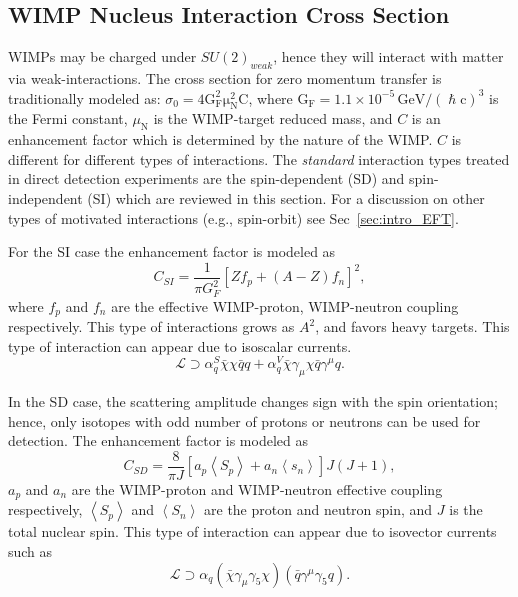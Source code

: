 \subsection{WIMP Nucleus Interaction Cross Section}
\label{subsubsec:WIMP_CS}

WIMPs may be charged under $SU(2)_{weak}$, hence they will interact with matter via weak-interactions. The cross section for zero momentum transfer is traditionally modeled as: $\sigma_0 = \mathrm{4G^2_F\mu_N^2C}$, where $\mathrm{G_F = 1.1\times 10^{-5}\,GeV/(\hslash c)^3}$ is the Fermi constant, $\mu_\mathrm{N}$ is the WIMP-target reduced mass, and $C$ is an enhancement factor which is determined by the nature of the WIMP. $C$ is different for different types of interactions. The \textit{standard} interaction types treated in direct detection experiments are the spin-dependent (SD) and spin-independent (SI) which are reviewed in this section. For a discussion on other types of motivated interactions (e.g., spin-orbit) see Sec~\ref{sec:intro_EFT}.

For the SI case the enhancement factor is modeled as
\begin{equation}
C_{SI} = \frac{1}{\pi G_F^2}[Zf_p + (A-Z)f_n]^2,
\end{equation} 
where $f_p$ and $f_n$ are the effective WIMP-proton, WIMP-neutron coupling respectively. This type of interactions grows as $A^2$, and favors heavy targets. This type of interaction can appear due to isoscalar currents.
\begin{equation}
\mathcal{L} \supset \alpha_q^S \bar{\chi} \chi \bar{q}q + \alpha_q^V\bar{\chi}\gamma_\mu\chi\bar{q}\gamma^\mu q.  
\end{equation}

In the SD case, the scattering amplitude changes sign with the spin orientation; hence, only isotopes with odd number of protons  or neutrons can be used for detection. The enhancement factor is modeled as
\begin{equation}
C_{SD} = \frac{8}{\pi J}[a_p\left<S_p\right> + a_n\left<s_n\right>]J(J+1),
\end{equation}  
$a_p$ and $a_n$ are the WIMP-proton and WIMP-neutron effective coupling respectively, $\left<S_p\right>$ and  $\left<S_n\right>$ are the proton and neutron spin, and $J$ is the total nuclear spin. This type of interaction can appear due to isovector currents such as
\begin{equation}
\mathcal{L} \supset \alpha_q(\bar{\chi}\gamma_\mu\gamma_5\chi)(\bar{q}\gamma^\mu\gamma_5q).
\end{equation}
